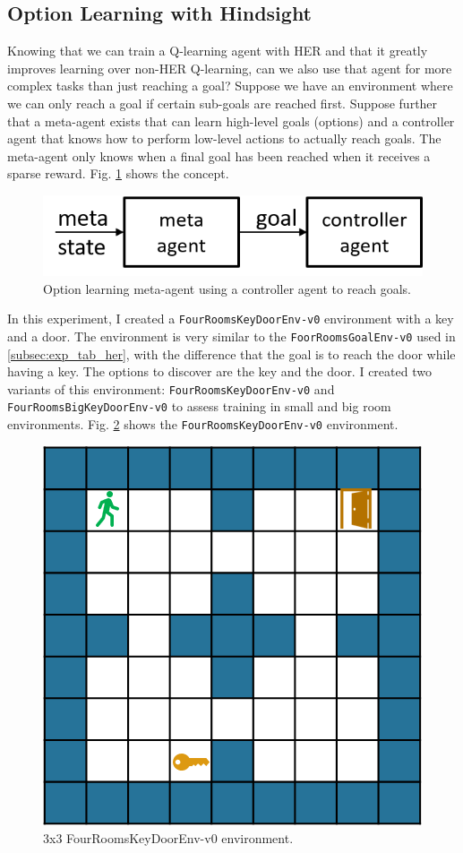 \documentclass[conference]{IEEEtran}
\begin{document}
\subsection{Option Learning with Hindsight}
Knowing that we can train a Q-learning agent with HER and that it greatly improves learning over non-HER Q-learning, can we also use that agent for more complex tasks than just reaching a goal? Suppose we have an environment where we can only reach a goal if certain sub-goals are reached first. Suppose further that a meta-agent exists that can learn high-level goals (options) and a controller agent that knows how to perform low-level actions to actually reach goals. The meta-agent only knows when a final goal has been reached when it receives a sparse reward. Fig. \ref{fig:experiment_option_her_concept} shows the concept.

\begin{figure}[ht]
\centering
\includegraphics[width=0.9\columnwidth]{img/option_her_concept.png}
\caption{Option learning meta-agent using a controller agent to reach goals.}
\label{fig:experiment_option_her_concept}
\end{figure}

In this experiment, I created a \texttt{FourRoomsKeyDoorEnv-v0} environment with a key and a door. The environment is very similar to the \texttt{FoorRoomsGoalEnv-v0} used in \ref{subsec:exp_tab_her}, with the difference that the goal is to reach the door while having a key. The options to discover are the key and the door. I created two variants of this environment: \texttt{FourRoomsKeyDoorEnv-v0} and \texttt{FourRoomsBigKeyDoorEnv-v0} to assess training in small and big room environments. Fig. \ref{fig:experiment_option_her_keydoor_env} shows the \texttt{FourRoomsKeyDoorEnv-v0} environment.

\begin{figure}[ht]
\centering
\includegraphics[width=0.5\columnwidth]{img/FourRoomsKeyDoorEnv-v0.png}
\caption{3x3 FourRoomsKeyDoorEnv-v0 environment.}
\label{fig:experiment_option_her_keydoor_env}
\end{figure}
\end{document}
